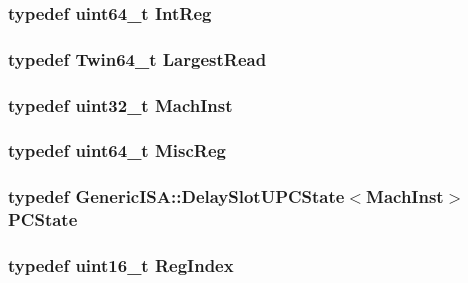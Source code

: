 \hypertarget{namespaceSparcISA_a0e080577527fb3e9685399f75b5caf15}{
\subsubsection[{IntReg}]{\setlength{\rightskip}{0pt plus 5cm}typedef uint64\_\-t {\bf IntReg}}}
\label{namespaceSparcISA_a0e080577527fb3e9685399f75b5caf15}
\hypertarget{namespaceSparcISA_aca26dbbb6d5074318b8557e012e98a34}{
\subsubsection[{LargestRead}]{\setlength{\rightskip}{0pt plus 5cm}typedef {\bf Twin64\_\-t} {\bf LargestRead}}}
\label{namespaceSparcISA_aca26dbbb6d5074318b8557e012e98a34}
\hypertarget{namespaceSparcISA_a301c22ea09fa33dcfe6ddf22f203699c}{
\subsubsection[{MachInst}]{\setlength{\rightskip}{0pt plus 5cm}typedef {\bf uint32\_\-t} {\bf MachInst}}}
\label{namespaceSparcISA_a301c22ea09fa33dcfe6ddf22f203699c}
\hypertarget{namespaceSparcISA_aa16539aa6584fd12f7d6fa868f75b4de}{
\subsubsection[{MiscReg}]{\setlength{\rightskip}{0pt plus 5cm}typedef uint64\_\-t {\bf MiscReg}}}
\label{namespaceSparcISA_aa16539aa6584fd12f7d6fa868f75b4de}
\hypertarget{namespaceSparcISA_ad2dd2c09ea20fdef260773e5cb128f93}{
\subsubsection[{PCState}]{\setlength{\rightskip}{0pt plus 5cm}typedef {\bf GenericISA::DelaySlotUPCState}$<${\bf MachInst}$>$ {\bf PCState}}}
\label{namespaceSparcISA_ad2dd2c09ea20fdef260773e5cb128f93}
\hypertarget{namespaceSparcISA_a69329e1d929a534ff51be6cf8216b69a}{
\subsubsection[{RegIndex}]{\setlength{\rightskip}{0pt plus 5cm}typedef uint16\_\-t {\bf RegIndex}}}
